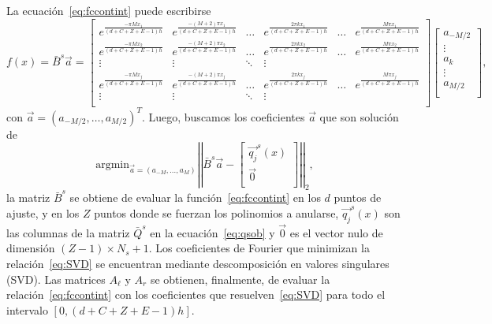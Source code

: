La ecuación~\eqref{eq:fccontint} puede escribirse
\begin{equation*}
f(x)=\bar{B}^s \vec{a}=
\begin{bmatrix}
    e^{\frac{-\pi M x_1}{(d+C+Z+E-1)h}}  & e^{\frac{-(M+2)\pi  x_1}{(d+C+Z+E-1)h}} & \dots & 
    e^{\frac{2\pi k x_1}{(d+C+Z+E-1)h}}  & \dots  & e^{\frac{M \pi  x_1}{(d+C+Z+E-1)h}} \\
    e^{\frac{-\pi M x_2}{(d+C+Z+E-1)h}}  & e^{\frac{-(M+2)\pi  x_2}{(d+C+Z+E-1)h}}  & \dots & 
    e^{\frac{2\pi k x_2}{(d+C+Z+E-1)h}}  & \dots  & e^{\frac{M \pi  x_2}{(d+C+Z+E-1)h}} \\
    \vdots  & \vdots & \ddots & \vdots \\
    e^{\frac{-\pi M x_j}{(d+C+Z+E-1)h}}  & e^{\frac{-(M+2)\pi  x_j}{(d+C+Z+E-1)h}}  & \dots & 
    e^{\frac{2\pi k x_j}{(d+C+Z+E-1)h}}  & \dots & e^{\frac{M \pi  x_j}{(d+C+Z+E-1)h}} \\
    \vdots  & \vdots & \ddots & \vdots \\
\end{bmatrix}
\begin{bmatrix}
    a_{-M/2}\\
    \vdots\\
    a_k\\
    \vdots\\
    a_{M/2} \\
\end{bmatrix},
\label{eq:fccontint2}
\end{equation*}
con $\vec{a}=(a_{-M/2},\ldots,a_{M/2})^T$. 
Luego, buscamos los coeficientes $\vec{a}$ que son solución de 
\begin{equation}
\text{argmin}_{\vec{a}=(a_{-M},\ldots,a_M)} \left | \left|\bar{B}^s \vec{a}-
\begin{bmatrix}
    \vec{q_j}^s(x)\\
    \vec{0} \\
\end{bmatrix}
\right|\right|_2,
\label{eq:SVD}
\end{equation}
la matriz $\bar{B}^s$ se obtiene 
de evaluar la función~\eqref{eq:fccontint} en los $d$ puntos de ajuste, y en los $Z$ puntos donde se fuerzan los polinomios a anularse, $ \vec{q_j}^s(x)$ son las columnas 
de la matriz $\bar{Q}^s$ en la ecuación~\eqref{eq:qsob} y $\vec{0}$ es el vector nulo de dimensión $(Z-1)\times N_s +1$. Los coeficientes de Fourier que minimizan la relación~\eqref{eq:SVD} se encuentran mediante descomposición en valores singulares (SVD). 
Las matrices $A_{\ell}$ y $A_r$ se obtienen, finalmente, de evaluar la relación~\eqref{eq:fccontint} con los coeficientes que resuelven~\eqref{eq:SVD} 
para todo el intervalo $[0,(d+C+Z+E-1)h]$.


